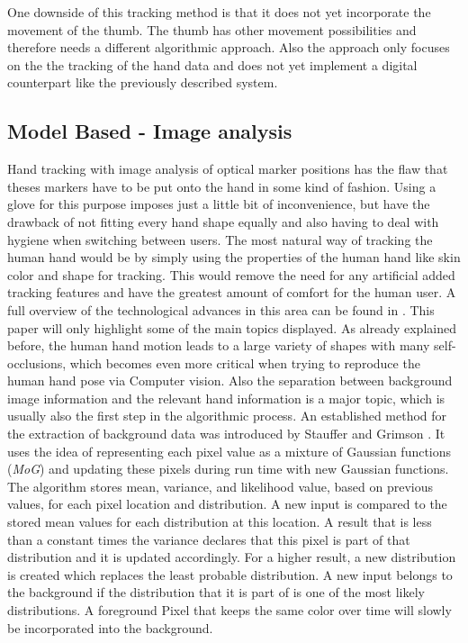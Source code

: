 One downside of this tracking method is that it does not yet incorporate the movement of the thumb. The thumb has other movement possibilities and therefore needs a different algorithmic approach. Also the approach only focuses on the the tracking of the hand data and does not yet implement a digital counterpart like the previously described system.
\subsection{Model Based - Image analysis}
Hand tracking with image analysis of optical marker positions has the flaw that theses markers have to be put onto the hand in some kind of fashion. Using a glove for this purpose imposes just a little bit of inconvenience, but have the drawback of not fitting every hand shape equally and also having to deal with hygiene when switching between users. The most natural way of tracking the human hand would be by simply using the properties of the human hand like skin color and shape for tracking. This would remove the need for any artificial added tracking features and have the greatest amount of comfort for the human user.
A full overview of the technological advances in this area can be found in \cite{Moeslund.2006,Moeslund.2001}. This paper will only highlight some of the main topics displayed.
As already explained before, the human hand motion leads to a large variety of shapes with many self-occlusions, which becomes even more critical when trying to reproduce the human hand pose via Computer vision. Also the separation between background image information and the relevant hand information is a major topic, which is usually also the first step in the algorithmic process.
An established method for the extraction of background data was introduced by Stauffer and Grimson \cite{Stauffer.1999}. It uses the idea of representing each pixel value as a mixture of Gaussian functions (\textit{MoG}) and updating these pixels during run time with new Gaussian functions.
The algorithm stores mean, variance, and likelihood value, based on previous values, for each pixel location and distribution. 
A new input is compared to the stored mean values for each distribution at this location.
A result that is less than a constant times the variance declares that this pixel is part of that distribution and it is updated accordingly. For a higher result, a new distribution is created which replaces the least probable distribution. A new input belongs to the background if the distribution that it is part of is one of the most likely distributions.
A foreground Pixel that keeps the same color over time will slowly be incorporated into the background.

